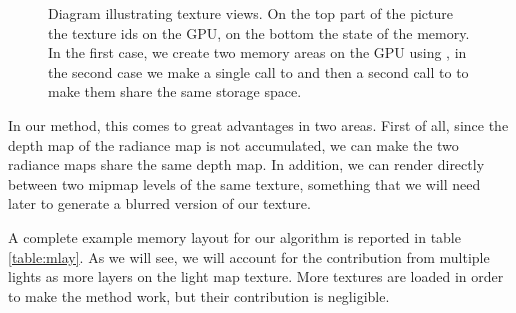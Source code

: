 \begin{figure}[h]
\centering
{}
\caption{Diagram illustrating texture views. On the top part of the picture the texture ids on the GPU, on the bottom the state of the memory. In the first case, we create two memory areas on the GPU using , in the second case we make a single call to  and then a second call to  to make them share the same storage space.}
\label{fig:textureviews}
\end{figure}


In our method, this comes to great advantages in two areas. First of all, since the depth map of the radiance map is not accumulated, we can make the two radiance maps share the same depth map. In addition, we can render directly between two mipmap levels of the same texture, something that we will need later to generate a blurred version of our texture.

A complete example memory layout for our algorithm is reported in table \ref{table:mlay}. As we will see, we will account for the contribution from multiple lights as more layers on the light map texture. More textures are loaded in order to make the method work, but their contribution is negligible.

